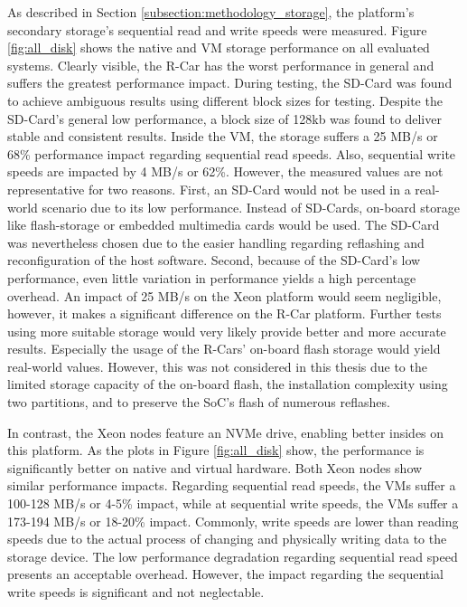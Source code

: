             \noindent As described in Section \ref{subsection:methodology_storage}, the platform's secondary storage's sequential read and write speeds were measured.
            Figure \ref{fig:all_disk} shows the native and \ac{VM} storage performance on all evaluated systems.
            Clearly visible, the R-Car has the worst performance in general and suffers the greatest performance impact.
            During testing, the SD-Card was found to achieve ambiguous results using different block sizes for testing. 
            Despite the SD-Card's general low performance, a block size of 128kb was found to deliver stable and consistent results.
            Inside the \ac{VM}, the storage suffers a 25 MB/s or 68\% performance impact regarding sequential read speeds.
            Also, sequential write speeds are impacted by 4 MB/s or 62\%.
            However, the measured values are not representative for two reasons.
            First, an SD-Card would not be used in a real-world scenario due to its low performance.
            Instead of SD-Cards, on-board storage like flash-storage or embedded multimedia cards would be used.
            The SD-Card was nevertheless chosen due to the easier handling regarding reflashing and reconfiguration of the host software.
            Second, because of the SD-Card's low performance, even little variation in performance yields a high percentage overhead.
            An impact of 25 MB/s on the Xeon platform would seem negligible, however, it makes a significant difference on the R-Car platform.
            Further tests using more suitable storage would very likely provide better and more accurate results.
            Especially the usage of the R-Cars' on-board flash storage would yield real-world values.
            However, this was not considered in this thesis due to the limited storage capacity of the on-board flash, the installation complexity using two partitions, and to preserve the \ac{SoC}'s flash of numerous reflashes.
            
            \noindent In contrast, the Xeon nodes feature an NVMe drive, enabling better insides on this platform.
            As the plots in Figure \ref{fig:all_disk} show, the performance is significantly better on native and virtual hardware.
            Both Xeon nodes show similar performance impacts.
            Regarding sequential read speeds, the \acp{VM} suffer a 100-128 MB/s or 4-5\% impact, while at sequential write speeds, the \acp{VM} suffer a 173-194 MB/s or 18-20\% impact.
            Commonly, write speeds are lower than reading speeds due to the actual process of changing and physically writing data to the storage device.  
            The low performance degradation regarding sequential read speed presents an acceptable overhead.
            However, the impact regarding the sequential write speeds is significant and not neglectable.
            
